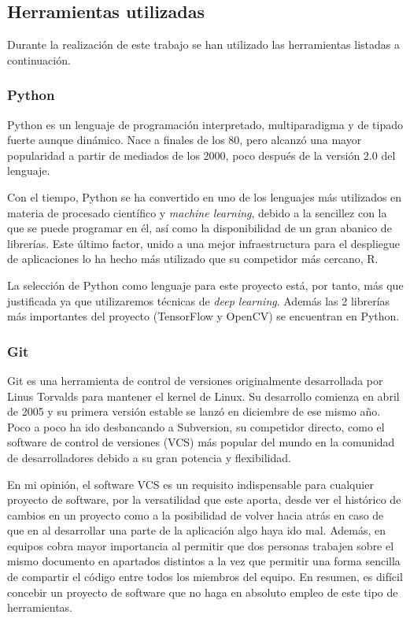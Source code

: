 \subsection{Herramientas utilizadas}
Durante la realización de este trabajo se han utilizado las herramientas listadas a continuación.

\subsubsection*{Python}

Python es un lenguaje de programación interpretado, multiparadigma y de tipado fuerte aunque dinámico. Nace a finales de los 80, pero alcanzó una mayor popularidad a partir de mediados de los 2000, poco después de la versión 2.0 del lenguaje. 

Con el tiempo, Python se ha convertido en uno de los lenguajes más utilizados en materia de procesado científico y \textit{machine learning}, debido a la sencillez con la que se puede programar en él, así como la disponibilidad de un gran abanico de librerías. Este último factor, unido a una mejor infraestructura para el despliegue de aplicaciones lo ha hecho más utilizado que su competidor más cercano, R.

La selección de Python como lenguaje para este proyecto está, por tanto, más que justificada ya que utilizaremos técnicas de \textit{deep learning}. Además las 2 librerías más importantes del proyecto (TensorFlow y OpenCV) se encuentran en Python.

\subsubsection*{Git}

Git es una herramienta de control de versiones originalmente desarrollada por Linus Torvalds para mantener el kernel de Linux. Su desarrollo comienza en abril de 2005 y su primera versión estable se lanzó en diciembre de ese mismo año. Poco a poco ha ido desbancando a Subversion, su competidor directo, como el software de control de versiones (VCS) más popular del mundo en la comunidad de desarrolladores debido a su gran potencia y flexibilidad.

En mi opinión, el software VCS es un requisito indispensable para cualquier proyecto de software, por la versatilidad que este aporta, desde ver el histórico de cambios en un proyecto como a la posibilidad de volver hacia atrás en caso de que en al desarrollar una parte de la aplicación algo haya ido mal. Además, en equipos cobra mayor importancia al permitir que dos personas trabajen sobre el mismo documento en apartados distintos a la vez que permitir una forma sencilla de compartir el código entre todos los miembros del equipo. En resumen, es difícil concebir un proyecto de software que no haga en absoluto empleo de este tipo de herramientas.

